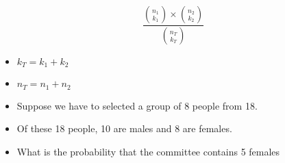 \documentclass[]{report}
\begin{document}
\[ \frac{ {n_1 \choose k_1}\times {n_2 \choose k_2} }{{n_T \choose k_T}}  \]

\begin{itemize}
\item $k_T = k_1 + k_2$
\item $n_T = n_1 + n_2$

\item Suppose we have to selected a group of 8 people from 18.
\item Of these 18 people, 10 are males and 8 are females.
\item What is the probability that
the committee contains 5 females
\end{itemize}
\end{document}
